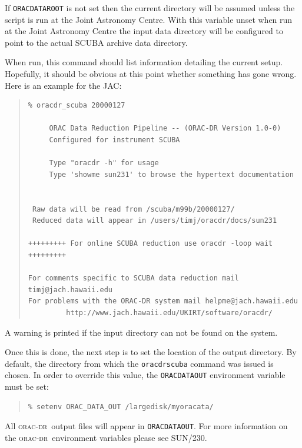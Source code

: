 \documentclass[twoside,11pt]{article}
\newcommand{\xref}[3]{#1}
\renewcommand{\_}{\texttt{\symbol{95}}}
\newcommand{\oracdr}{\xref{\textsc{orac-dr}}{sun230}{}}
\newenvironment{myquote}{\begin{quote}\begin{small}}{\end{small}\end{quote}}
\begin{document}
If \texttt{ORAC\_DATA\_ROOT} is not set then the current directory
will be assumed unless the script is run at the Joint Astronomy Centre.
With this variable unset when run at the Joint Astronomy Centre
the input data directory will be configured to point to the actual
SCUBA archive data directory.

When run, this command should list information detailing the
current setup. Hopefully, it should be obvious at this point
whether something has gone wrong. Here is an example for the JAC:

\begin{myquote}
\begin{verbatim}
% oracdr_scuba 20000127
 
     ORAC Data Reduction Pipeline -- (ORAC-DR Version 1.0-0)
     Configured for instrument SCUBA
 
     Type "oracdr -h" for usage
     Type 'showme sun231' to browse the hypertext documentation
 
 
 Raw data will be read from /scuba/m99b/20000127/
 Reduced data will appear in /users/timj/oracdr/docs/sun231
 
+++++++++ For online SCUBA reduction use oracdr -loop wait +++++++++

For comments specific to SCUBA data reduction mail timj@jach.hawaii.edu
For problems with the ORAC-DR system mail helpme@jach.hawaii.edu
         http://www.jach.hawaii.edu/UKIRT/software/oracdr/

\end{verbatim}
\end{myquote}

A warning is printed if the input directory can not be found
on the system.

Once this is done, the next step is to set the location of the
output directory. By default, the directory from which the
\texttt{oracdr\_scuba} command was issued is chosen. In order
to override this value, the \texttt{ORAC\_DATA\_OUT} environment
variable must be set:

\begin{myquote}
\begin{verbatim}
% setenv ORAC_DATA_OUT /largedisk/myoracata/
\end{verbatim}
\end{myquote}

All \oracdr\ output files will appear in \texttt{ORAC\_DATA\_OUT}.
For more information on the \oracdr\ environment variables please
see \xref{SUN/230}{sun230}{shell_variables}.
\end{document}
